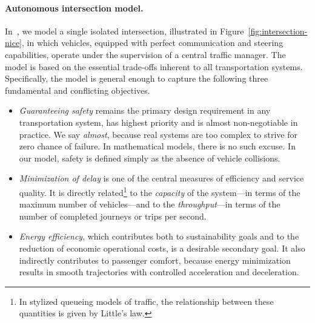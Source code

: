 \documentclass[a4paper]{report}
\theoremstyle{definition}
\theoremstyle{plain}
\begin{document}
\paragraph{Autonomous intersection model.}
In~, we model a single isolated intersection,
illustrated in Figure~\ref{fig:intersection-nice}, in which vehicles, equipped
with perfect communication and steering capabilities, operate under the
supervision of a central traffic manager.
%
The model is based on the essential trade-offs inherent to all transportation
systems. Specifically, the model is general enough to capture the following
three fundamental and conflicting objectives.
%
\begin{itemize}
  \item \emph{Guaranteeing safety} remains the primary design requirement in any
        transportation system, has highest priority and is almost non-negotiable
        in practice. We say \emph{almost}, because real systems are too complex
        to strive for zero chance of failure. In mathematical models, there is
        no such excuse. In our model, safety is defined simply as the absence of
        vehicle collisions.

  \item \emph{Minimization of delay} is one of the central measures of efficiency and
        service quality. It is directly related\footnote{In stylized queueing models of traffic, the relationship between these quantities is given by Little's law.} to the \emph{capacity} of the
        system---in terms of the maximum number of vehicles---and to the
        \emph{throughput}---in terms of the number of completed journeys or trips per
        second.

  \item \emph{Energy efficiency}, which contributes both to sustainability goals
        and to the reduction of economic operational costs, is a desirable
        secondary goal. It also indirectly contributes to passenger comfort,
        because energy minimization results in smooth trajectories with
        controlled acceleration and deceleration.
\end{itemize}
\end{document}
